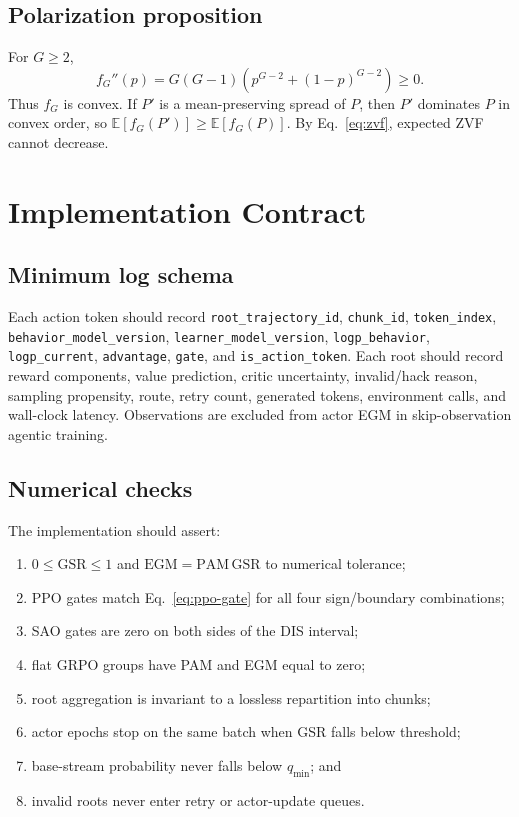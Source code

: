 \documentclass{article}
\newcommand{\egm}{\mathrm{EGM}}
\newcommand{\pam}{\mathrm{PAM}}
\newcommand{\gsr}{\mathrm{GSR}}
\newcommand{\E}{\mathbb{E}}
\begin{document}
\subsection{Polarization proposition}

For $G\geq2$,
\begin{equation*}
  f_G''(p)=G(G-1)\left(p^{G-2}+(1-p)^{G-2}\right)\geq0.
\end{equation*}
Thus $f_G$ is convex.  If $P'$ is a mean-preserving spread of $P$, then $P'$ 
dominates $P$ in convex order, so $\E[f_G(P')]\geq\E[f_G(P)]$.  By
Eq.~\eqref{eq:zvf}, expected ZVF cannot decrease.

\section{Implementation Contract}
\label{app:implementation}

\subsection{Minimum log schema}

Each action token should record
\texttt{root\_trajectory\_id}, \texttt{chunk\_id}, \texttt{token\_index},
\texttt{behavior\_model\_version}, \texttt{learner\_model\_version},
\texttt{logp\_behavior}, \texttt{logp\_current}, \texttt{advantage},
\texttt{gate}, and \texttt{is\_action\_token}.  Each root should record
reward components, value prediction, critic uncertainty, invalid/hack reason,
sampling propensity, route, retry count, generated tokens, environment calls,
and wall-clock latency.  Observations are excluded from actor EGM in
skip-observation agentic training.

\subsection{Numerical checks}

The implementation should assert:
\begin{enumerate}[leftmargin=*]
  \item $0\leq\gsr\leq1$ and $\egm=\pam\,\gsr$ to numerical tolerance;
  \item PPO gates match Eq.~\eqref{eq:ppo-gate} for all four sign/boundary
  combinations;
  \item SAO gates are zero on both sides of the DIS interval;
  \item flat GRPO groups have PAM and EGM equal to zero;
  \item root aggregation is invariant to a lossless repartition into chunks;
  \item actor epochs stop on the same batch when GSR falls below threshold;
  \item base-stream probability never falls below $q_{\min}$; and
  \item invalid roots never enter retry or actor-update queues.
\end{enumerate}
\end{document}
